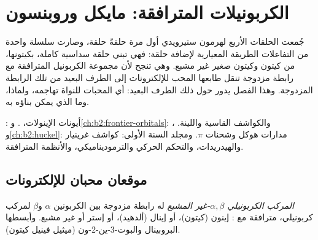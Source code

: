 \chapter{الكربونيلات المترافقة: مايكل وروبنسون}\label{ch:b2:conjugate-additions}

جُمعت الحلقات الأربع لهرمون ستيرويدي أول مرة حلقةً حلقة، وصارت سلسلة واحدة من
التفاعلات الطريقة المعيارية لإضافة حلقة: فهي تبني حلقة سداسية كاملة، بكيتونها،
من كيتون وكيتون صغير غير مشبع. وهي تنجح لأن مجموعة الكربونيل المترافقة
مع رابطة مزدوجة  تنقل طابعها المحب للإلكترونات إلى الطرف البعيد من تلك الرابطة المزدوجة.
وهذا الفصل يدور حول ذلك الطرف البعيد: أي المحبات للنواة تهاجمه، ولماذا، وما الذي يمكن بناؤه به.

\begin{recall}
: أيونات الإينولات، . و\cref{ch:b2:frontier-orbitals}:  ، والكواشف القاسية واللينة. و\cref{ch:b2:huckel}: مدارات هوكل وشحنات $\pi$.
ومجلد السنة الأولى: كواشف غرينيار والهيدريدات، والتحكم الحركي والترموديناميكي، والأنظمة
المترافقة.
\end{recall}

\section{موقعان محبان للإلكترونات}

\begin{definition}\label{def:b2:conjugate-additions:enone}
\emph{المركب الكربونيلي $\alpha,\beta$-غير المشبع}
له رابطة مزدوجة  بين الكربونين $\alpha$
و$\beta$ لمركب كربونيلي، مترافقة مع : إينون (كيتون)، أو إينال
(ألدهيد)، أو إستر أو  غير مشبع. وأبسطها البروبينال  
والبوت-3-ين-2-ون  (ميثيل فينيل كيتون).
\end{definition}

